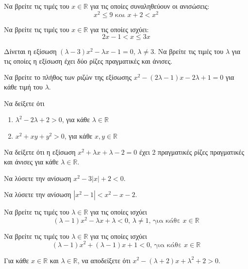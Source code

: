 \documentclass{../../presentation}
\begin{document}
\begin{askisi}
  Να βρείτε τις τιμές του $x\in\mathbb{R}$ για τις οποίες συναληθεύουν οι ανισώσεις:
  $$x^2\le 9 \text{ και } x+2<x^2$$
\end{askisi}

\begin{askisi}
  Να βρείτε τις τιμές του $x\in\mathbb{R}$ για τις οποίες ισχύει:
  $$2x-1<x\le 3x$$
\end{askisi}

\begin{askisi}
  Δίνεται η εξίσωση $(λ-3)x^2-λx-1=0$, $λ\ne 3$. Να βρείτε τις τιμές του $λ$ για τις οποίες η εξίσωση έχει δύο ρίζες πραγματικές και άνισες.
\end{askisi}

\begin{askisi}
  Να βρείτε το πλήθος των ριζών της εξίσωσης $x^2-(2λ-1)x-2λ+1=0$ για κάθε τιμή του $λ$.
\end{askisi}

\begin{askisi}
  Να δείξετε ότι
  \begin{enumerate}[<+->]
    \item $λ^2-2λ+2>0$, για κάθε $λ\in\mathbb{R}$
    \item $x^2+xy+y^2>0$, για κάθε $x,y\in\mathbb{R}$
  \end{enumerate}
\end{askisi}

\begin{askisi}
  Να δείξετε ότι η εξίσωση $x^2+λx+λ-2=0$ έχει 2 πραγματικές ρίζες πραγματικές και άνισες για κάθε $λ\in\mathbb{R}$.
\end{askisi}

\begin{askisi}
  Να λύσετε την ανίσωση $x^2-3|x|+2<0$.
\end{askisi}


\begin{askisi}
  Να λύσετε την ανίσωση $|x^2-1|<x^2-x-2$.
\end{askisi}

\begin{askisi}
  Να βρείτε τις τιμές του $λ\in\mathbb{R}$ για τις οποίες ισχύει
  $$(λ-1)x^2-λx+λ<0 \text{, } λ\ne 1 \text{, για κάθε } x\in\mathbb{R}$$
\end{askisi}

\begin{askisi}
  Να βρείτε τις τιμές του $λ\in\mathbb{R}$ για τις οποίες ισχύει
  $$(λ-1)x^2+(λ-1)x+1<0 \text{, για κάθε } x\in\mathbb{R}$$
\end{askisi}

\begin{askisi}
  Για κάθε $x\in\mathbb{R}$ και $λ\in\mathbb{R}$, να αποδείξετε ότι $x^2-(λ+2)x+λ^2+2>0$.
\end{askisi}
\end{document}
